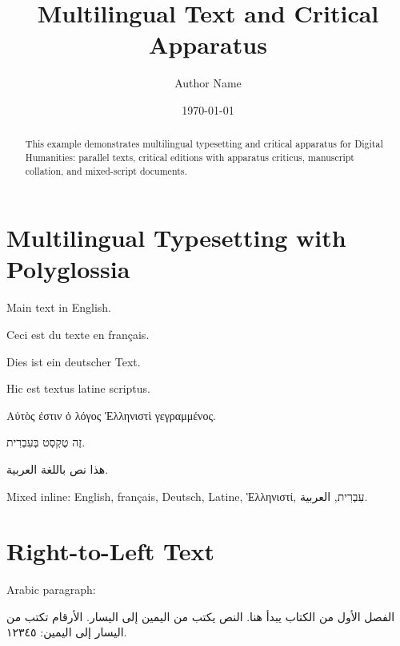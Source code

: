 \documentclass[12pt,a4paper]{article}
\title{Multilingual Text and Critical Apparatus}
\author{Author Name}
\date{\today}
\begin{document}
\maketitle

\begin{abstract}
This example demonstrates multilingual typesetting and critical apparatus
for Digital Humanities: parallel texts, critical editions with apparatus
criticus, manuscript collation, and mixed-script documents.
\end{abstract}

\section{Multilingual Typesetting with Polyglossia}\label{sec:polyglossia}
Main text in English.

\begin{french}
Ceci est du texte en français.
\end{french}

\begin{german}
Dies ist ein deutscher Text.
\end{german}

\begin{latin}
Hic est textus latine scriptus.
\end{latin}

\begin{greek}
Αὐτὸς ἐστιν ὁ λόγος Ἑλληνιστὶ γεγραμμένος.
\end{greek}

\begin{hebrew}
זֶה טֶקְסְט בְּעִבְרִית.
\end{hebrew}

\begin{arabic}
هذا نص باللغة العربية.
\end{arabic}

Mixed inline: English, \textfrench{français}, \textgerman{Deutsch},
\textlatin{Latine}, \textgreek{Ἑλληνιστί}, \texthebrew{עִבְרִית}, \textarabic{العربية}.

\section{Right-to-Left Text}\label{sec:rtl}
Arabic paragraph:
\begin{arabic}
الفصل الأول من الكتاب يبدأ هنا. النص يكتب من اليمين إلى اليسار.
الأرقام تكتب من اليسار إلى اليمين: ١٢٣٤٥.
\end{arabic}
\end{document}
